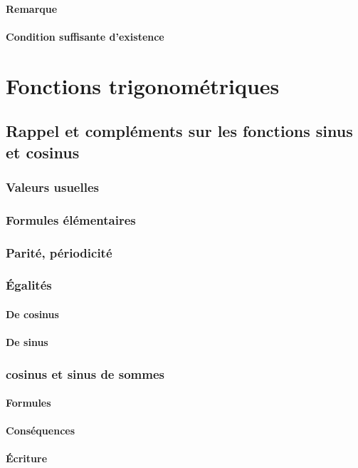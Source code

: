 \documentclass[12pt,a4paper,french]{book}
\begin{document}
			\subsubsection{Remarque}
			\subsubsection{Condition suffisante d'existence}
\chapter{Fonctions trigonométriques}
	\section{Rappel et compléments sur les fonctions sinus et cosinus}
		\subsection{Valeurs usuelles}
		\subsection{Formules élémentaires}
		\subsection{Parité, périodicité}
		\subsection{Égalités}
			\subsubsection{De cosinus}
			\subsubsection{De sinus}
		\subsection{cosinus et sinus de sommes}
			\subsubsection{Formules}
			\subsubsection{Conséquences}
			\subsubsection{Écriture}
\end{document}
